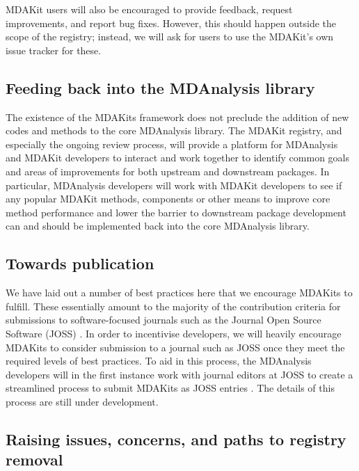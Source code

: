 \documentclass[9pt,whitepaper]{livecoms}
\begin{document}
MDAKit users will also be encouraged to provide feedback, request improvements, and report bug fixes. However, this should happen outside the scope of the registry; instead, we will ask for users to use the MDAKit’s own issue tracker for these.

\subsection{Feeding back into the MDAnalysis library}
\label{sec:feedingback}

The existence of the MDAKits framework does not preclude the addition of new codes and methods to the core MDAnalysis library. The MDAKit registry, and especially the ongoing review process, will provide a platform for MDAnalysis and MDAKit developers to interact and work together to identify common goals and areas of improvements for both upstream and downstream packages. In particular, MDAnalysis developers will work with MDAKit developers to see if any popular MDAKit methods, components or other means to improve core method performance and lower the barrier to downstream package development can and should be implemented back into the core MDAnalysis library.

\subsection{Towards publication}
\label{sec:publication}

We have laid out a number of best practices here that we encourage MDAKits to fulfill. These essentially amount to the majority of the contribution criteria for submissions to software-focused journals such as the Journal Open Source Software (JOSS) \cite{noauthor_journal_nodate}. In order to incentivise developers, we will heavily encourage MDAKits to consider submission to a journal such as JOSS \cite{noauthor_journal_nodate} once they meet the required levels of best practices. To aid in this process, the MDAnalysis developers will in the first instance work with journal editors at JOSS to create a streamlined process to submit MDAKits as JOSS entries \cite{noauthor_submitting_2018}. The details of this process are still under development.

\subsection{Raising issues, concerns, and paths to registry removal}
\label{sec:removal}
\end{document}
